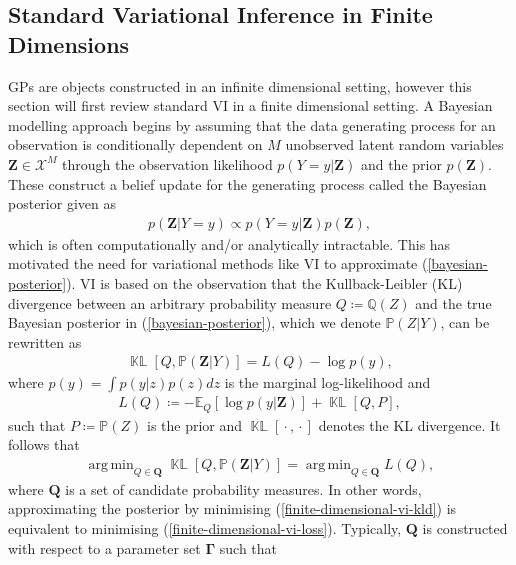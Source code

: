 \documentclass{article}
\newcommand{\KLD}{\operatorname{\mathbb{KL}}}
\newcommand{\wc}{\operatorname{{}\cdot{}}}
\DeclareMathOperator*{\argmin}{arg\,min}
\numberwithin{equation}{section}
\begin{document}
\subsection{Standard Variational Inference in Finite Dimensions}\label{section:vi-in-finite-dimensions}
GPs are objects constructed in an infinite dimensional setting, however this section will first review standard VI in a finite dimensional setting.
A Bayesian modelling approach begins by assuming that the data generating process for an observation is conditionally dependent on $M$ unobserved latent random variables $\mathbf{Z} \in \mathcal{X}^M$ through the observation likelihood $p(Y=y\vert \mathbf{Z})$ and the prior $p(\mathbf{Z})$.
These construct a belief update for the generating process called the Bayesian posterior given as
\begin{align}
    p(\mathbf{Z} \vert Y=y) \propto p(Y=y\vert \mathbf{Z})p(\mathbf{Z}),
    \label{bayesian-posterior}
\end{align}
which is often computationally and/or analytically intractable.
This has motivated the need for variational methods like VI to approximate (\ref{bayesian-posterior}).
VI is based on the observation that the Kullback-Leibler (KL) divergence between an arbitrary probability measure $Q \coloneqq \mathbb{Q}(Z)$ and the true Bayesian posterior in (\ref{bayesian-posterior}), which we denote $\mathbb{P}(Z\vert Y)$, can be rewritten as
\begin{align}
    \KLD\left[Q, \mathbb{P}(\mathbf{Z} \vert Y)\right] = L(Q) - \log p(y),
    \label{finite-dimensional-vi-kld}
\end{align}
where $p(y) = \int p(y\vert z)p(z) dz$ is the marginal log-likelihood and
\begin{align}
    L(Q) \coloneqq -\mathbb{E}_{Q}\left[\log p(y \vert \mathbf{Z})\right] + \KLD\left[Q, P\right],
    \label{finite-dimensional-vi-loss}
\end{align}
such that $P \coloneqq \mathbb{P}(Z)$ is the prior and $\KLD\left[\wc, \wc\right]$ denotes the KL divergence.
It follows that
\begin{align}
    \argmin_{Q \in \boldsymbol{Q}} \KLD\left[Q, \mathbb{P}(\mathbf{Z}\vert Y)\right] = \argmin_{Q \in \boldsymbol{Q}} L(Q),
    \label{optimal-approximation-vi}
\end{align}
where $\boldsymbol{Q}$ is a set of candidate probability measures.
In other words, approximating the posterior by minimising (\ref{finite-dimensional-vi-kld}) is equivalent to minimising (\ref{finite-dimensional-vi-loss}). Typically, $\boldsymbol{Q}$ is constructed with respect to a parameter set $\boldsymbol{\Gamma}$ such that
\end{document}
